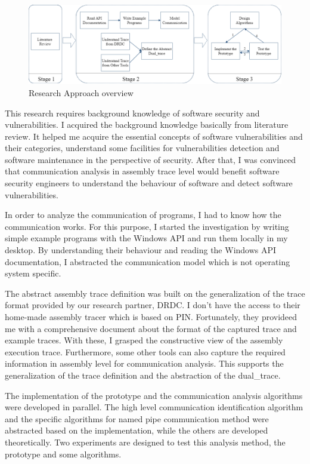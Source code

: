 \begin{figure}[H]
  \centerline{\includegraphics[scale=0.44]{Figures/methodology}}
  \caption{Research Approach overview}
  \label{methodology}
  \end{figure}

This research requires background knowledge of software security and vulnerabilities. I acquired the background knowledge basically from literature review. It helped me acquire the essential concepts of software vulnerabilities and their categories, understand some facilities for vulnerabilities detection and software maintenance in the perspective of security. After that, I was convinced that communication analysis in assembly trace level would benefit software security engineers to understand the behaviour of software and detect software vulnerabilities. 

In order to analyze the communication of programs, I had to know how the communication works. For this purpose, I started the investigation by writing simple example programs with the Windows API and run them locally in my desktop. By understanding their behaviour and reading the Windows API documentation, I abstracted the communication model which is not operating system specific.

The abstract assembly trace definition was built on the generalization of the trace format provided by our research partner, DRDC. I don't have the access to their home-made assembly tracer which is based on PIN\cite{_pin_????}. Fortunately, they provideed me with a comprehensive document about the format of the captured trace and example traces. With these, I grasped the constructive view of the assembly execution trace. Furthermore, some other tools can also capture the required information in assembly level for communication analysis. This supports the generalization of the trace definition and the abstraction of the dual\_trace.

The implementation of the prototype and the communication analysis algorithms were developed in parallel. The high level communication identification algorithm and the specific algorithms for named pipe communication method were abstracted based on the implementation, while the others are developed theoretically. Two experiments are designed to test this analysis method, the prototype and some algorithms. 


